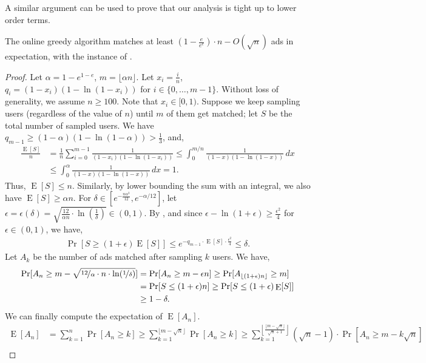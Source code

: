 \documentclass[11pt]{article}
\DeclareMathOperator*{\E}{E}
\begin{document}
A similar argument can be used  to prove that our analysis is tight up to lower order terms.
\begin{lemmarep}\label{lem:analysis-online-u1-tight}
The online greedy algorithm matches at least $\left(1-\frac{e}{e^e}\right)\cdot n - O(\sqrt{n})$ ads in expectation, with the instance of . \end{lemmarep}
\begin{proof}
Let $\alpha=1-e^{1-e}$, $m=\lfloor \alpha n \rfloor$. Let $x_i=\frac{i}{n}$, $q_i=(1-x_i)(1-\ln(1-x_i))$ for $i\in\{0,\dots, m-1\}$. Without loss of generality, we assume $n\geq 100$. Note that $x_i\in[0,1)$. Suppose we keep sampling users (regardless of the value of $n$) until $m$ of them get matched; let $S$ be the total number of  sampled users. We have $q_{m-1}\geq (1-\alpha)(1-\ln(1-\alpha))>\frac{1}{3}$,
 and,
\begin{align*}
\frac{\E[S]}{n} &= \frac{1}{n} \sum_{i=0}^{m-1} \frac{1}{(1-x_i)(1-\ln(1-x_i))}  \leq \int_0^{m/n} \frac{1}{(1-x)(1-\ln(1-x))} \, dx \\
& \leq \int_0^{\alpha} \frac{1}{(1-x)(1-\ln(1-x))} \, dx = 1.
\end{align*}
Thus, $\E[S]\leq n$. Similarly, by lower bounding the sum with an integral, we also have $\E[S]\geq \alpha n$. For $\delta\in[e^{-\frac{n\alpha^3}{12}},e^{-\alpha/12}]$, let $\epsilon=\epsilon(\delta)=\sqrt{\frac{12}{\alpha n}\cdot \ln(\frac{1}{\delta})} \in(0,1)$. By , and since $\epsilon-\ln(1+\epsilon) \geq \frac{\epsilon^2}{4}$ for $\epsilon\in(0,1)$, we have,
\begin{align*}
\Pr[S\geq (1+\epsilon)\E[S]] \leq e^{-q_{m-1}\cdot \E[S] \cdot \frac{\epsilon^2}{4}} \leq \delta.
\end{align*}
Let $A_k$ be the number of ads matched after sampling $k$ users. We have,
\begin{align*}
\Pr[A_n \geq m - \sqrt{\nicefrac{12}{\alpha}\cdot n \cdot \ln(\nicefrac{1}{\delta})}] &= \Pr[A_n \geq m - \epsilon n] \geq \Pr[A_{\lfloor (1+\epsilon)n \rfloor} \geq m]\\
&= \Pr[S\leq (1+\epsilon)n] \geq \Pr[S\leq (1+\epsilon)\E[S]]  \\
&\geq 1 - \delta.
\end{align*}
We can finally compute the expectation of $\E[A_n]$. 
\begin{align*}
\E[A_n] & = \sum_{k=1}^n \Pr[A_n \geq k] \geq \sum_{k=1}^{\lfloor m-\sqrt{n} \rfloor} \Pr[A_n \geq k] \geq \sum_{k=1}^{\left\lfloor \frac{\lfloor m - \sqrt{n} \rfloor}{\sqrt{n}+1} \right\rfloor} (\sqrt{n}-1)  \cdot \Pr[A_n \geq m - k\sqrt{n}]\\

\end{align*}
\end{proof}
\end{document}
